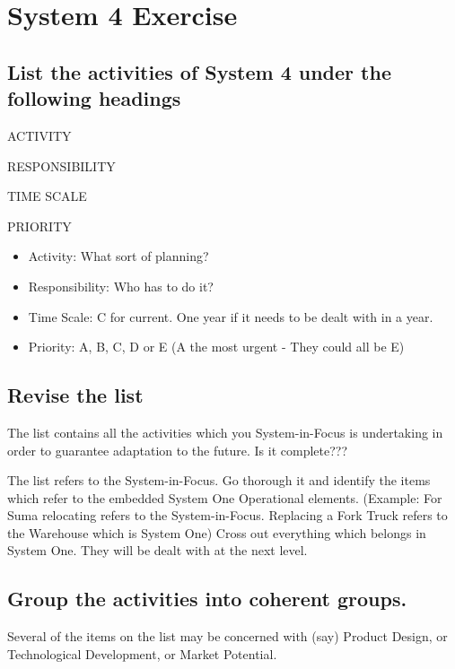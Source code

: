 \section*{System 4 Exercise}
\subsection*{List the activities of System 4 under the following headings}

ACTIVITY

RESPONSIBILITY

TIME SCALE

PRIORITY

  \begin{itemize}
    \item Activity: What sort of planning?

    \item Responsibility: Who has to do it?

    \item Time Scale: C for current. One year if it needs to be dealt with in a year.

    \item Priority: A, B, C, D or E (A the most urgent - They could all be E)

  \end{itemize} 
\subsection*{Revise the list}
The list contains all the activities which you System-in-Focus is undertaking in order to guarantee adaptation to the future. Is it complete???

The list refers to the System-in-Focus. Go thorough it and identify the items which refer to the embedded System One Operational elements. (Example: For Suma relocating refers to the System-in-Focus. Replacing a Fork Truck refers to the Warehouse which is System One) Cross out everything which belongs in System One. They will be dealt with at the next level.

\subsection*{Group the activities into coherent groups.}
Several of the items on the list may be concerned with (say) Product Design, or Technological Development, or Market Potential.

